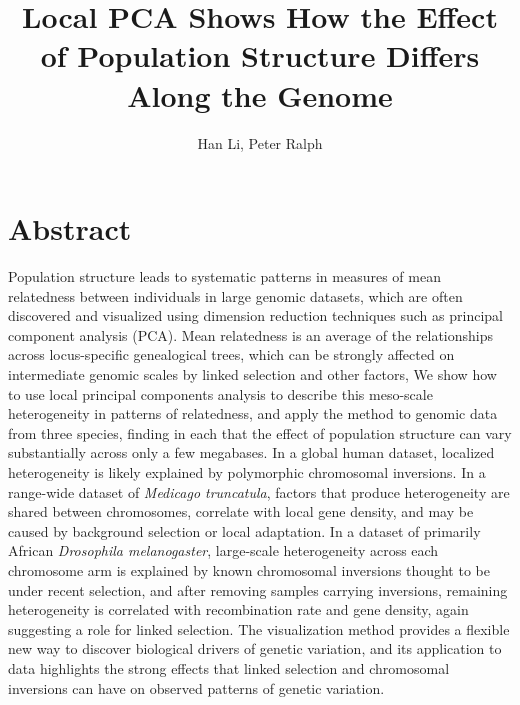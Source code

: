 \documentclass[11pt, oneside]{article}   	%
\title{Local PCA Shows How the Effect of Population Structure Differs Along the Genome}
\author{Han Li, Peter Ralph}
\begin{document}
\maketitle


\section*{Abstract}

Population structure leads to systematic patterns in measures of mean relatedness
between individuals in large genomic datasets,
which are often discovered and visualized using dimension reduction techniques such as principal component analysis (PCA).
Mean relatedness
is an average of the relationships across locus-specific genealogical trees,
which can be strongly affected on intermediate genomic scales by linked selection and other factors,
We show how to use local principal components analysis to describe this 
meso-scale heterogeneity in patterns of relatedness,
and apply the method to genomic data from three species,
finding in each that the effect of population structure 
can vary substantially across only a few megabases.
In a global human dataset, localized heterogeneity is likely explained by polymorphic chromosomal inversions.
In a range-wide dataset of \textit{Medicago truncatula},
factors that produce heterogeneity are shared between chromosomes,
correlate with local gene density,
and may be caused by background selection or local adaptation.
In a dataset of primarily African \textit{Drosophila melanogaster}, large-scale heterogeneity across each chromosome arm
is explained by known chromosomal inversions thought to be under recent selection,
and after removing samples carrying inversions, remaining heterogeneity is correlated with recombination rate and gene density,
again suggesting a role for linked selection.
The visualization method provides a flexible new way to discover biological drivers of genetic variation,
and its application to data highlights the strong effects that linked selection and chromosomal inversions
can have on observed patterns of genetic variation.
\end{document}
